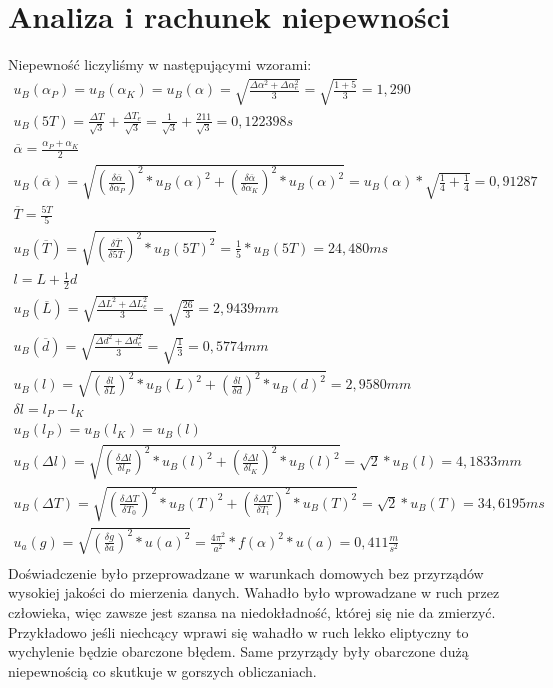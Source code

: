 \documentclass{article}
\begin{document}
\clearpage
\section{Analiza i rachunek niepewności}
Niepewność liczyliśmy w następującymi wzorami:
\begin{gather*}
    u_{B}(\alpha_{P}) = u_{B}(\alpha_{K}) = u_{B}(\alpha) = \sqrt{\frac{\Delta \alpha^2 + \Delta \alpha_{e}^2}{3}} = \sqrt{\frac{1 + 5}{3}} = 1,290 \\
    u_{B}(5T) = \frac{\Delta T}{\sqrt{3}} + \frac{\Delta T_{e}}{\sqrt{3}} = \frac{1}{\sqrt{3}} + \frac{211}{\sqrt{3}} = 0,122398 s \\
    \overline{\alpha} = \frac{\alpha_{P} + \alpha_{K}}{2} \\
    u_{B}(\overline{\alpha}) = \sqrt{(\frac{\delta \overline{\alpha}}{\delta \alpha_{P}})^2 * u_{B}(\alpha)^2 + (\frac{\delta \overline{\alpha}}{\delta \alpha_{K}})^2 * u_{B}(\alpha)^2} 
    = u_{B}(\alpha) * \sqrt{\frac{1}{4} + \frac{1}{4}} = 0,91287 \\
    \overline{T} = \frac{5T}{5} \\
    u_{B}(\overline{T}) = \sqrt{(\frac{\delta \overline{T}}{\delta 5T})^2 * u_{B}(5T)^2} = \frac{1}{5} * u_{B}(5T) = 24,480 ms \\
    l = L + \frac{1}{2} d \\
    u_{B}(\overline{L}) = \sqrt{\frac{\Delta L^2 + \Delta L_{e}^2}{3}} = \sqrt{\frac{26}{3}} = 2,9439 mm \\
    u_{B}(\overline{d}) = \sqrt{\frac{\Delta d^2 + \Delta d_{e}^2}{3}} = \sqrt{\frac{1}{3}} = 0,5774 mm \\
    u_{B}(l) = \sqrt{(\frac{\delta l}{\delta L})^2 * u_{B}(L)^2 + (\frac{\delta l}{\delta d})^2 * u_{B}(d)^2} = 2,9580 mm \\
    \delta l = l_{P} - l_{K} \\
    u_{B}(l_{P}) = u_{B}(l_{K}) = u_{B}(l) \\
    u_{B}(\Delta l) = \sqrt{(\frac{\delta \Delta l}{\delta l_{P}})^2 * u_{B}(l)^2 + (\frac{\delta \Delta l}{\delta l_{K}})^2 * u_{B}(l)^2} = \sqrt{2} * u_{B}(l) = 4,1833 mm \\
    u_{B}(\Delta T) = \sqrt{(\frac{\delta \Delta T}{\delta T_{0}})^2 * u_{B}(T)^2 + (\frac{\delta \Delta T}{\delta T_{i}})^2 * u_{B}(T)^2} = \sqrt{2} * u_{B}(T) = 34,6195 ms \\
    u_a(g) = \sqrt{(\frac{\delta g}{\delta a})^2 * u(a)^2} = \frac{4\pi^2}{a^2} * f(\alpha)^2 * u(a) = 0,411 \frac{m}{s^2}\\
\end{gather*}
Doświadczenie było przeprowadzane w warunkach domowych bez przyrządów wysokiej jakości do mierzenia danych. Wahadło było wprowadzane w ruch przez człowieka, więc zawsze jest szansa na niedokładność, której się nie da zmierzyć. Przykładowo jeśli niechcący wprawi się wahadło w ruch lekko eliptyczny to wychylenie będzie obarczone błędem. Same przyrządy były obarczone dużą niepewnością co skutkuje w gorszych obliczaniach.
\end{document}
